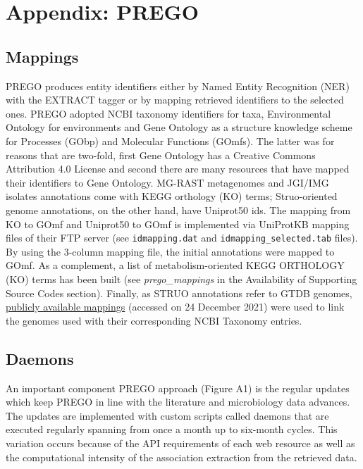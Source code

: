 \chapter{Appendix: PREGO}

\section{Mappings}
\label{app:A}


PREGO produces entity identifiers either by Named Entity Recognition (NER) with the EXTRACT tagger or by mapping retrieved identifiers to the selected ones. 
PREGO adopted NCBI taxonomy identifiers for taxa, Environmental Ontology for environments and Gene Ontology as a structure knowledge scheme for Processes (GObp) and Molecular Functions (GOmfs). 
The latter was for reasons that are two-fold, first Gene Ontology has a Creative Commons Attribution 4.0 License and second there are many resources that have mapped their identifiers to Gene Ontology.
MG-RAST metagenomes and JGI/IMG isolates annotations come with KEGG orthology (KO) terms; 
Struo-oriented genome annotations, on the other hand, have Uniprot50 ids. 
The mapping from KO to GOmf and Uniprot50 to GOmf is implemented via UniProtKB mapping files of their FTP server (see \texttt{idmapping.dat} and \texttt{idmapping\_selected.tab} files). 
By using the 3-column mapping file, the initial annotations were mapped to GOmf. As a complement, a list of metabolism-oriented KEGG ORTHOLOGY (KO) terms has been built (see \textit{prego\_mappings} in the Availability of Supporting Source Codes section).
Finally, as STRUO annotations refer to GTDB genomes, \href{http://ftp.tue.mpg.de/ebio/projects/struo/GTDB_release89/metadata/}{publicly available mappings} (accessed on 24 December 2021) were used to link the genomes used with their corresponding NCBI Taxonomy entries.



\section{Daemons}
\label{app:B}

An important component PREGO approach (Figure A1) is the regular updates which keep PREGO in line with the literature and microbiology data advances. 
The updates are implemented with custom scripts called daemons that are executed regularly spanning from once a month up to six-month cycles. 
This variation occurs because of the API requirements of each web resource as well as the computational intensity of the association extraction from the retrieved data.

